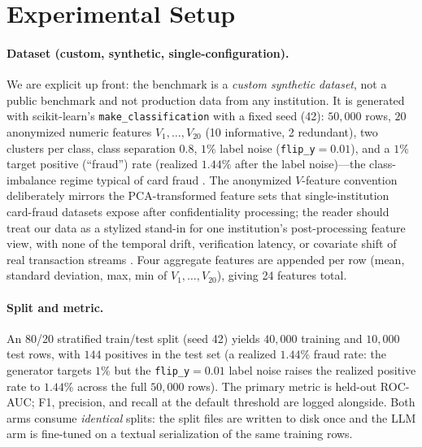 \documentclass{article}
\begin{document}
 \section{Experimental Setup}
\label{sec:p8-setup}

\paragraph{Dataset (custom, synthetic, single-configuration).}
We are explicit up front: the benchmark is a \emph{custom synthetic dataset},
not a public benchmark and not production data from any institution. It is
generated with scikit-learn's \texttt{make\_classification}
\citep{pedregosa2011sklearn} with a fixed seed (42): $50{,}000$ rows, $20$
anonymized numeric features $V_1,\dots,V_{20}$ (10 informative, 2 redundant),
two clusters per class, class separation $0.8$, $1\%$ label noise
(\texttt{flip\_y}$=0.01$), and a $1\%$ target positive (``fraud'') rate
(realized $1.44\%$ after the label noise)---the
class-imbalance regime typical of card fraud \citep{dalpozzolo2018realistic}.
The anonymized $V$-feature convention deliberately mirrors the PCA-transformed
feature sets that single-institution card-fraud datasets expose after
confidentiality processing; the reader should treat our data as a stylized
stand-in for one institution's post-processing feature view, with none of the
temporal drift, verification latency, or covariate shift of real transaction
streams \citep{dalpozzolo2018realistic}. Four aggregate features are appended
per row (mean, standard deviation, max, min of $V_1,\dots,V_{20}$), giving 24
features total.

\paragraph{Split and metric.}
An 80/20 stratified train/test split (seed 42) yields $40{,}000$ training and
$10{,}000$ test rows, with $144$ positives in the test set (a realized
$1.44\%$ fraud rate: the generator targets $1\%$ but the
\texttt{flip\_y}$=0.01$ label noise raises the realized positive rate to
$1.44\%$ across the full $50{,}000$ rows). The primary
metric is held-out ROC-AUC; F1, precision, and recall at the default threshold
are logged alongside. Both arms consume \emph{identical} splits: the split
files are written to disk once and the LLM arm is fine-tuned on a textual
serialization of the same training rows.
\end{document}
